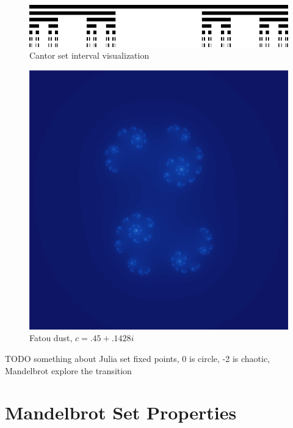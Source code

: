 \documentclass{article}
\begin{document}
\begin{figure}[!h]
    \includegraphics[width=\linewidth]{Cantor_set_in_seven_iterations.png}
    \caption{Cantor set interval visualization \cite{Cantor}}%
\end{figure}

\begin{figure}[!htbp]
    \centering
    \includegraphics[width=.4\linewidth]{julia_fatou_dust_c_45_1428.png}
    \caption{Fatou dust, $c = .45 + .1428i$}%
\end{figure}

 

TODO something about Julia set fixed points, 0 is circle, -2 is chaotic, Mandelbrot explore the transition

 
\section{Mandelbrot Set Properties}
\end{document}
